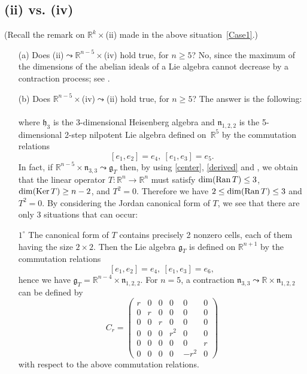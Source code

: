 \documentclass[
reqno]{amsart}
\begin{document}
\subsection{(ii) vs. (iv)}\label{Case7} 
(Recall the remark on ${{\mathbb R}}^k\times$(ii) made in the above situation~\ref{Case1}.)
\begin{itemize}
\item[(a)] Does (ii)${\leadsto}$${{\mathbb R}}^{n-5}\times$(iv) hold true, for $n\ge 5$? 
No, since the maximum of the dimensions of the abelian ideals of a Lie algebra  
cannot decrease by a contraction process; see \cite[Th. 1(8)]{NP06}. 
\item[(b)] Does ${{\mathbb R}}^{n-5}\times$(iv)${\leadsto}$(ii) hold true, for $n\ge 5$?  
The answer is the following: 
\\  
\\ where ${{\mathfrak h}}_3$ is the 3-dimensional Heisenberg algebra and 
${{\mathfrak n}}_{1,2,2}$ is the 5-dimen\-sional 2-step nilpotent Lie algebra 
defined on~${{\mathbb R}}^5$ by the commutation relations 
\begin{equation}\label{N122}
[e_1,e_2]=e_4,\ [e_1,e_3]=e_5.
\end{equation}
In fact, if ${{\mathbb R}}^{n-5}\times{{\mathfrak n}}_{3,3} {\leadsto}{{\mathfrak g}}_T$ then, 
by using \eqref{center}, \eqref{derived} and \cite[Th.1((3)--(4),(14))]{NP06}, 
we obtain that the linear operator $T\colon{{\mathbb R}}^n\to{{\mathbb R}}^n$ must 
satisfy $\dim({{\rm Ran}\,} T)\le 3$, $\dim({{\rm Ker}\,} T)\ge n-2$, and $T^2=0$. 
Therefore we have $2\le\dim({{\rm Ran}\,} T)\le 3$ and $T^2=0$. 
By considering the Jordan canonical form of $T$, 
we see that there are only 3 situations that can occur:  

\smallbreak 

$1^\circ$ The canonical form of $T$ contains precisely 2 nonzero cells, 
each of them having the size $2\times 2$. 
Then the Lie algebra ${{\mathfrak g}}_T$ is defined on ${{\mathbb R}}^{n+1}$ by the commutation relations 
$$[e_1,e_2]=e_4,\ [e_1,e_3]=e_6,$$
hence we have ${{\mathfrak g}}_T={{\mathbb R}}^{n-4}\times{{\mathfrak n}}_{1,2,2}$. 
For $n=5$, a contraction ${{\mathfrak n}}_{3,3} {\leadsto} {{\mathbb R}}\times{{\mathfrak n}}_{1,2,2}$ 
can be defined by 
$$C_r=\begin{pmatrix}
r & 0 & 0 & 0 & 0 & 0 \\
0 & r & 0 & 0 & 0 & 0 \\
0 & 0 & r & 0 & 0 & 0 \\
0 & 0 & 0 & r^2 & 0 & 0 \\
0 & 0 & 0 & 0 & 0 & r \\
0 & 0 & 0 & 0 & -r^2 & 0 
\end{pmatrix}$$
with respect to the above commutation relations. 


\end{itemize}
\end{document}
